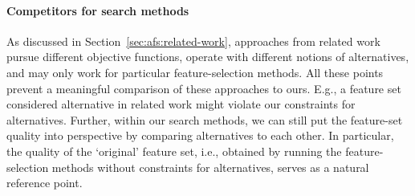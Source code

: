 \documentclass{article}
\theoremstyle{definition}
\begin{document}
\paragraph{Competitors for search methods}

As discussed in Section~\ref{sec:afs:related-work}, approaches from related work pursue different objective functions, operate with different notions of alternatives, and may only work for particular feature-selection methods.
All these points prevent a meaningful comparison of these approaches to ours.
E.g., a feature set considered alternative in related work might violate our constraints for alternatives.
Further, within our search methods, we can still put the feature-set quality into perspective by comparing alternatives to each other.
In particular, the quality of the `original' feature set, i.e., obtained by running the feature-selection methods without constraints for alternatives, serves as a natural reference point.
\end{document}
